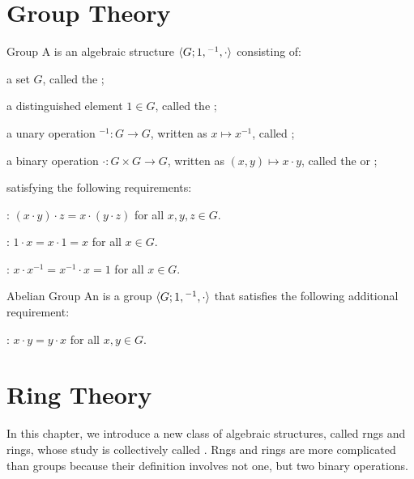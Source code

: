 \documentclass[12pt]{report}
\begin{document}
\chapter{Group Theory}

\begin{dfnbox}{Group}
	A  is an algebraic structure ${\langle {G; 1, {}^{-1}, \cdot} \rangle}$ consisting of:
	\begin{boxitems}
		\item a set $G$, called the ;
		\item a distinguished element $1 \in G$, called the ;
		\item a unary operation ${}^{-1}: G \to G$, written as $x \mapsto x^{-1}$, called ;
		\item a binary operation $\cdot: G \times G \to G$, written as $(x, y) \mapsto x \cdot y$, called the  or ;
	\end{boxitems}
	satisfying the following requirements:
	\begin{boxitems}
		\item {}: $(x \cdot y) \cdot z = x \cdot (y \cdot z)$ for all $x, y, z \in G$.
		\item {}: $1 \cdot x = x \cdot 1 = x$ for all $x \in G$.
		\item {}: $x \cdot x^{-1} = x^{-1} \cdot x = 1$ for all $x \in G$.
	\end{boxitems}
\end{dfnbox}

\begin{dfnbox}{Abelian Group}
	An  is a group ${\langle {G; 1, {}^{-1}, \cdot} \rangle}$ that satisfies the following additional requirement:
	\begin{boxitems}
		\item {}: $x \cdot y = y \cdot x$ for all $x, y \in G$.
	\end{boxitems}
\end{dfnbox}



\chapter{Ring Theory}

In this chapter, we introduce a new class of algebraic structures, called rngs and rings, whose study is collectively called . Rngs and rings are more complicated than groups because their definition involves not one, but two binary operations.
\end{document}
